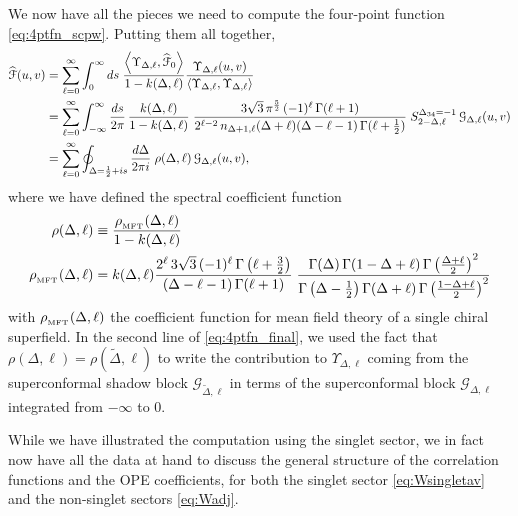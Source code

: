 \documentclass[11pt]{article}
\newcommand{\mft}{\text{\tiny MFT}}
\begin{document}
We now have all the pieces we need to compute the four-point function \eqref{eq:4ptfn_scpw}. Putting them all together,
%
\begin{equation}\label{eq:4ptfn_final}
\begin{split}
\widehat{\mathcal{F}}(u,v) 
&= 
	\sum_{\ell = 0}^{\infty}\int_{0}^{\infty}ds \; 
	\frac{\expval{\Upsilon_{\Delta,\ell},\widehat{\mathcal{F}}_{0}}}{1-k(\Delta,\ell)}\frac{\Upsilon_{\Delta,\ell}(u,v)}{\expval{ \Upsilon_{\Delta,\ell},\Upsilon_{\Delta,\ell}}} \\
&=
	 \sum_{\ell = 0}^{\infty}\int_{-\infty}^{\infty}\frac{ds}{2\pi}\,
	 \frac{k(\Delta,\ell)}{1-k(\Delta,\ell)} \;
	 \frac{3\sqrt{3}\, \pi^{\frac{5}{2}}\,(-1)^{\ell}\,\Gamma(\ell+1)}{2^{\ell-2}\, n_{\Delta+1,\ell}(\Delta+\ell)(\Delta-\ell-1)\,\Gamma(\ell+\frac{1}{2}) } \;
	 S_{2-\Delta,\ell}^{\Delta_{34}=-1}\,\mathcal{G}_{\Delta,\ell}(u,v) \\
&= 
	\sum_{\ell = 0}^{\infty}\oint_{\Delta=\frac{1}{2}+is}\frac{d\Delta}{2\pi i} \; \rho(\Delta,\ell)\, \mathcal{G}_{\Delta,\ell}(u,v),
\end{split}
\end{equation}
%
where we have defined the spectral coefficient function
%
\begin{equation}\label{eq:rho}
\begin{split}
\rho(\Delta,\ell) &\equiv 
	\frac{\rho_{_\mft}(\Delta,\ell)}{1-k(\Delta,\ell)} \\
\rho_{_\mft}(\Delta,\ell) &= 
	k(\Delta,\ell)\frac{2^{\ell}\, 3\sqrt{3}\, (-1)^{\ell}\,\Gamma\left(\ell+\frac{3}{2}\right)}{(\Delta-\ell-1) \, \Gamma(\ell+1)} \; 
	\frac{\Gamma(\Delta)\,\Gamma(1-\Delta+\ell)\,\Gamma\left(\frac{\Delta+\ell}{2}\right)^{2}}{\Gamma\left(\Delta-\frac{1}{2}\right) \Gamma(\Delta+\ell) \, \Gamma\left(\frac{1-\Delta+\ell}{2}\right)^{2}}
\end{split}	
\end{equation}
with $\rho_{_\mft}(\Delta,\ell)$ the coefficient function for mean field theory of a single chiral superfield. In the second line of \eqref{eq:4ptfn_final}, we used the fact that $\rho(\Delta,\ell) = \rho(\widetilde{\Delta},\ell)$ to write the contribution to $\Upsilon_{\Delta,\ell}$ coming from the superconformal shadow block $\mathcal{G}_{\widetilde{\Delta},\ell}$ in terms of the superconformal block $\mathcal{G}_{\Delta,\ell}$ integrated from $-\infty$ to $0$.

While we have illustrated the computation using the singlet sector, we in fact now have all the data at hand to discuss the general structure of the correlation functions and the OPE coefficients, for both the singlet sector \eqref{eq:Wsingletav} and the non-singlet sectors \eqref{eq:Wadj}.  
\end{document}
